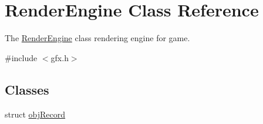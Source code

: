 \hypertarget{classRenderEngine}{}\section{Render\+Engine Class Reference}
\label{classRenderEngine}


The \hyperlink{classRenderEngine}{Render\+Engine} class rendering engine for game.  




{\ttfamily \#include $<$gfx.\+h$>$}

\subsection*{Classes}
\begin{DoxyCompactItemize}
\item 
struct \hyperlink{structRenderEngine_1_1objRecord}{obj\+Record}
\end{DoxyCompactItemize}
